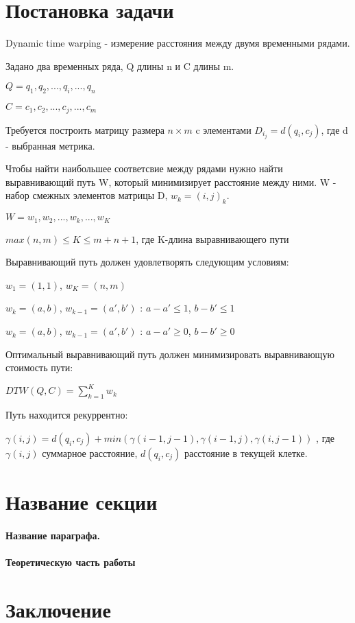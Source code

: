\documentclass[12pt,twoside]{article}
\begin{document}
				
				
    \section{Постановка задачи}
				Dynamic time warping - измерение расстояния между двумя временными рядами.
				
				Задано два временных ряда, Q длины n и C длины m.
				
				$Q=q_1,q_2, ..., q_i, ..., q_n $
				
				$C=c_1,c_2, ..., c_j, ..., c_m $
				
				Требуется построить матрицу размера $n\times m$ c элементами $D_i_j=d(q_i, c_j)$, где d - выбранная метрика.
				
				Чтобы найти наибольшее соответсвие между рядами нужно найти выравнивающий путь W, который минимизирует расстояние между ними. W - набор смежных элементов матрицы D, $w_k = (i, j)_k$.
				
				$W = w_1,w_2, ..., w_k, ..., w_K $

				$max(n, m)\leq K \leq m+n+1$, где K-длина выравнивающего пути
				
				Выравнивающий путь должен удовлетворять следующим условиям:
				
				$w_1=(1,1)$, $w_K=(n, m)$
				
				$w_k = (a, b)$, $w_{k-1}=(a', b')$ : $a-a' \leq 1$, $b-b' \leq 1$ 
				
				$w_k = (a, b)$, $w_{k-1}=(a', b')$ : $a-a' \geq 0$, $b-b'\geq 0$
				
				Оптимальный выравнивающий путь должен минимизировать выравнивающую стоимость пути:
				
				$DTW(Q, C)=\displaystyle\sum_{k=1}^{K} w_k$
				
				Путь находится рекуррентно:
				
				$\gamma(i, j) = d(q_i, c_j) + min({\gamma(i-1, j-1), \gamma(i-1, j), \gamma(i, j-1)})$ , где $\gamma(i, j)$ суммарное расстояние, $d(q_i, c_j)$ расстояние в текущей клетке.
				
				
				
				
				
		
		\section{Название секции}
    \paragraph{Название параграфа.}
    \paragraph{Теоретическую часть работы}
    \section{Заключение}

		 
    
    
    
\end{document}
